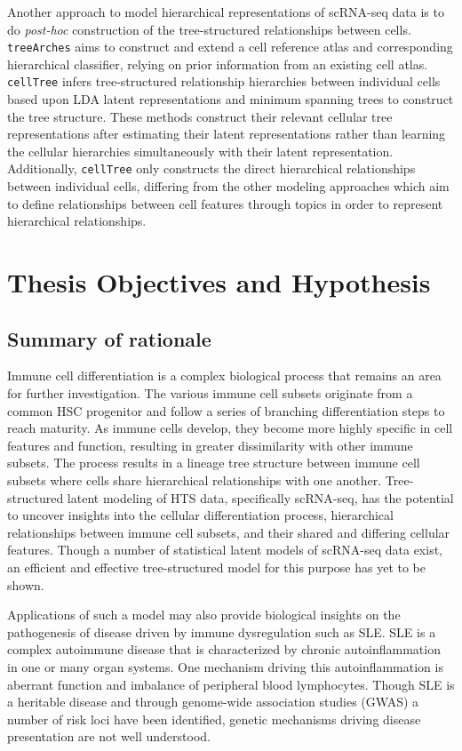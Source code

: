 Another approach to model hierarchical representations of scRNA-seq data is to do \textit{post-hoc} construction of the tree-structured relationships between cells. \texttt{treeArches} \cite{sc_hier} aims to construct and extend a cell reference atlas and corresponding hierarchical classifier, relying on prior information from an existing cell atlas. \texttt{cellTree} infers tree-structured relationship hierarchies between individual cells based upon LDA latent representations and minimum spanning trees to construct the tree structure. These methods construct their relevant cellular tree representations after estimating their latent representations rather than learning the cellular hierarchies simultaneously with their latent representation. Additionally, \texttt{cellTree} only constructs the direct hierarchical relationships between individual cells, differing from the other modeling approaches which aim to define relationships between cell features through topics in order to represent hierarchical relationships.

\newpage
\section{Thesis Objectives and Hypothesis}
\subsection{Summary of rationale}

Immune cell differentiation is a complex biological process that remains an area for further investigation. The various immune cell subsets originate from a common HSC progenitor and follow a series of branching differentiation steps to reach maturity. As immune cells develop, they become more highly specific in cell features and function, resulting in greater dissimilarity with other immune subsets. The process results in a lineage tree structure between immune cell subsets where cells share hierarchical relationships with one another. Tree-structured latent modeling of HTS data, specifically scRNA-seq, has the potential to uncover insights into the cellular differentiation process, hierarchical relationships between immune cell subsets, and their shared and differing cellular features. Though a number of statistical latent models of scRNA-seq data exist, an efficient and effective tree-structured model for this purpose has yet to be shown.

Applications of such a model may also provide biological insights on the pathogenesis of disease driven by immune dysregulation such as SLE. SLE is a complex autoimmune disease that is characterized by chronic autoinflammation in one or many organ systems. One mechanism driving this autoinflammation is aberrant function and imbalance of peripheral blood lymphocytes. Though SLE is a heritable disease and through genome-wide association studies (GWAS) a number of risk loci have been identified, genetic mechanisms driving disease presentation are not well understood. 

